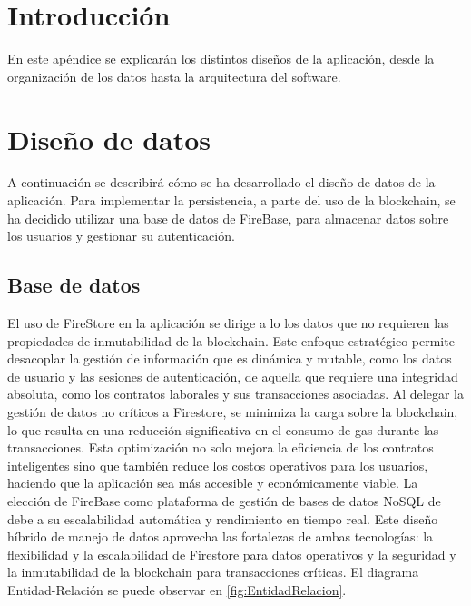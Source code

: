 
\section{Introducción}

En este apéndice se explicarán los distintos diseños de la aplicación, desde la organización de los datos hasta la arquitectura del software.

\section{Diseño de datos}

A continuación se describirá cómo se ha desarrollado el diseño de datos de la aplicación.
Para implementar la persistencia, a parte del uso de la blockchain, se ha decidido utilizar una base de datos de FireBase, para almacenar datos sobre los usuarios y gestionar su autenticación.

\subsection{Base de datos}

El uso de FireStore en la aplicación se dirige a lo los datos que no requieren las propiedades de inmutabilidad de la blockchain. Este enfoque estratégico permite desacoplar la gestión de información que es dinámica y mutable, como los datos de usuario y las sesiones de autenticación, de aquella que requiere una integridad absoluta, como los contratos laborales y sus transacciones asociadas.
Al delegar la gestión de datos no críticos a Firestore, se minimiza la carga sobre la blockchain, lo que resulta en una reducción significativa en el consumo de gas durante las transacciones. Esta optimización no solo mejora la eficiencia de los contratos inteligentes sino que también reduce los costos operativos para los usuarios, haciendo que la aplicación sea más accesible y económicamente viable.
La elección de FireBase como plataforma de gestión de bases de datos NoSQL de debe a su escalabilidad automática y rendimiento en tiempo real.
Este diseño híbrido de manejo de datos aprovecha las fortalezas de ambas tecnologías: la flexibilidad y la escalabilidad de Firestore para datos operativos y la seguridad y la inmutabilidad de la blockchain para transacciones críticas. 
El diagrama Entidad-Relación se puede observar en \ref{fig:EntidadRelacion}.

